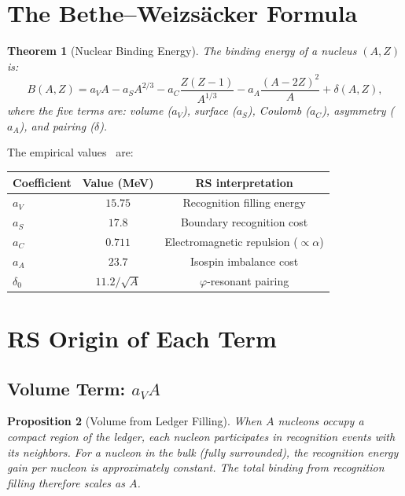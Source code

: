 \documentclass[12pt,a4paper]{article}
\newtheorem{theorem}{Theorem}[section]
\newtheorem{proposition}[theorem]{Proposition}
\theoremstyle{definition}
\theoremstyle{remark}
\begin{document}
\section{The Bethe--Weizs\"acker Formula}
\label{sec:bw}

\begin{theorem}[Nuclear Binding Energy]
\label{thm:binding}
The binding energy of a nucleus $(A, Z)$ is:
\begin{equation}
  \boxed{B(A,Z) = a_V A - a_S A^{2/3} -
  a_C \frac{Z(Z-1)}{A^{1/3}} -
  a_A \frac{(A - 2Z)^2}{A} + \delta(A,Z),}
  \label{eq:bw}
\end{equation}
where the five terms are: volume ($a_V$), surface ($a_S$),
Coulomb ($a_C$), asymmetry ($a_A$), and pairing ($\delta$).
\end{theorem}

The empirical values~\cite{Krane} are:

\begin{center}
\renewcommand{\arraystretch}{1.3}
\begin{tabular}{@{}lcc@{}}
\toprule
\textbf{Coefficient} & \textbf{Value (MeV)} &
\textbf{RS interpretation} \\
\midrule
$a_V$ & $15.75$ & Recognition filling energy \\
$a_S$ & $17.8$ & Boundary recognition cost \\
$a_C$ & $0.711$ & Electromagnetic repulsion
($\propto \alpha$) \\
$a_A$ & $23.7$ & Isospin imbalance cost \\
$\delta_0$ & $11.2/\sqrt{A}$ & $\varphi$-resonant pairing \\
\bottomrule
\end{tabular}
\end{center}

\section{RS Origin of Each Term}
\label{sec:terms}

\subsection{Volume Term: $a_V A$}

\begin{proposition}[Volume from Ledger Filling]
\label{prop:volume}
When $A$ nucleons occupy a compact region of the ledger, each
nucleon participates in recognition events with its neighbors.
For a nucleon in the bulk (fully surrounded), the recognition
energy gain per nucleon is approximately constant.  The total
binding from recognition filling therefore scales as $A$.
\end{proposition}
\end{document}
